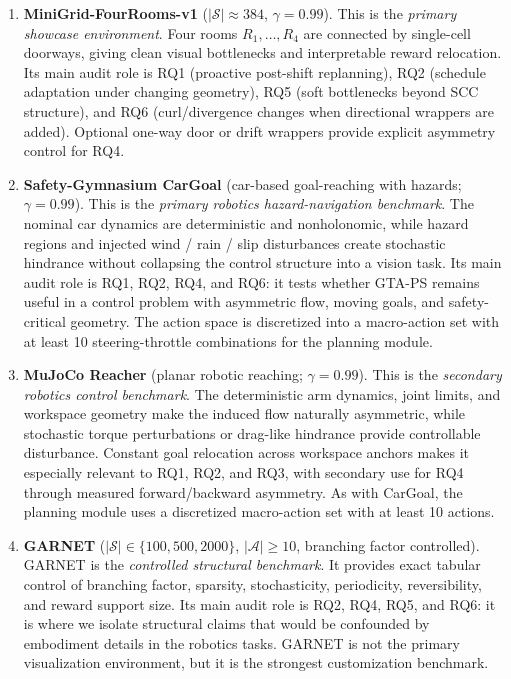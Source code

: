 \documentclass[10pt,a4paper]{article}
\begin{document}
\begin{enumerate}\setlength\itemsep{2pt}
  \item \textbf{MiniGrid-FourRooms-v1} \citep{chevalier2023minigrid,sutton1999between}
    ($|\mathcal{S}|{\approx}384$, $\gamma{=}0.99$).
    This is the \emph{primary showcase environment}.  Four rooms $R_1,\ldots,R_4$ are connected by single-cell doorways, giving clean visual bottlenecks and interpretable reward relocation.  Its main audit role is RQ1 (proactive post-shift replanning), RQ2 (schedule adaptation under changing geometry), RQ5 (soft bottlenecks beyond SCC structure), and RQ6 (curl/divergence changes when directional wrappers are added).  Optional one-way door or drift wrappers provide explicit asymmetry control for RQ4.

  \item \textbf{Safety-Gymnasium CarGoal} \citep{ji2023safetygymnasium}
    (car-based goal-reaching with hazards; $\gamma{=}0.99$).
    This is the \emph{primary robotics hazard-navigation benchmark}.  The nominal car dynamics are deterministic and nonholonomic, while hazard regions and injected wind / rain / slip disturbances create stochastic hindrance without collapsing the control structure into a vision task.  Its main audit role is RQ1, RQ2, RQ4, and RQ6: it tests whether GTA-PS remains useful in a control problem with asymmetric flow, moving goals, and safety-critical geometry.  The action space is discretized into a macro-action set with at least 10 steering-throttle combinations for the planning module.

  \item \textbf{MuJoCo Reacher} \citep{todorov2012mujoco,towers2024gymnasium}
    (planar robotic reaching; $\gamma{=}0.99$).
    This is the \emph{secondary robotics control benchmark}.  The deterministic arm dynamics, joint limits, and workspace geometry make the induced flow naturally asymmetric, while stochastic torque perturbations or drag-like hindrance provide controllable disturbance.  Constant goal relocation across workspace anchors makes it especially relevant to RQ1, RQ2, and RQ3, with secondary use for RQ4 through measured forward/backward asymmetry.  As with CarGoal, the planning module uses a discretized macro-action set with at least 10 actions.

  \item \textbf{GARNET} \citep{archibald1995generation}
    ($|\mathcal{S}| \in \{100, 500, 2000\}$, $|\mathcal{A}|\geq 10$, branching factor controlled).
    GARNET is the \emph{controlled structural benchmark}.  It provides exact tabular control of branching factor, sparsity, stochasticity, periodicity, reversibility, and reward support size.  Its main audit role is RQ2, RQ4, RQ5, and RQ6: it is where we isolate structural claims that would be confounded by embodiment details in the robotics tasks.  GARNET is not the primary visualization environment, but it is the strongest customization benchmark.
\end{enumerate}
\end{document}
